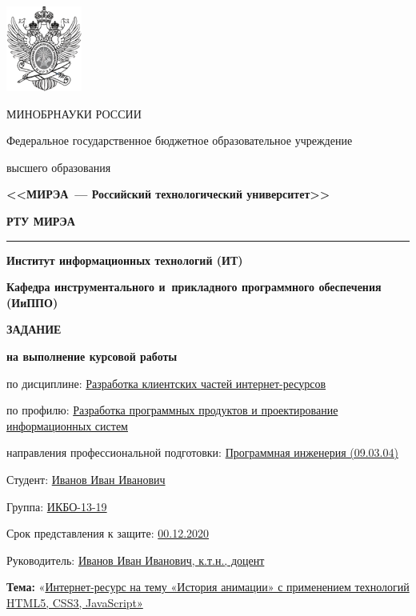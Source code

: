 \documentclass[12pt, a4paper]{extarticle}
\begin{document}
\fontsize{12pt}{1.08}\selectfont

\begin{center}
\includegraphics[width=0.97917in,height=1.10417in]{Images/mirea.png}

\setlength{\parskip}{6pt}
МИНОБРНАУКИ РОССИИ 

Федеральное государственное бюджетное образовательное учреждение
\setlength{\parskip}{0pt}

высшего образования

\textbf{<<МИРЭА~--- Российский технологический университет>>}

\fontsize{16pt}{1.08}\selectfont
\textbf{РТУ МИРЭА}
\fontsize{12pt}{1.08}\selectfont

\setlength{\parskip}{6pt}
\noindent\rule{\textwidth}{2pt}

\textbf{Институт информационных технологий (ИТ)}
\setlength{\parskip}{0pt}

\textbf{Кафедра инструментального и~прикладного программного обеспечения (ИиППО)}

\bigskip
\textbf{ЗАДАНИЕ}

\textbf{на выполнение курсовой работы}

\end{center}

\justifying

\setlength{\parindent}{0in}
по дисциплине: \uline{Разработка клиентских частей
интернет-ресурсов}

по профилю: \uline{Разработка программных продуктов и проектирование
информационных систем}

направления профессиональной подготовки: \uline{Программная
инженерия (09.03.04)}

\medskip

Студент: \uline{Иванов Иван Иванович}

Группа: \uline{ИКБО-13-19}

Срок представления к защите: \uline{00.12.2020}

Руководитель: \uline{Иванов Иван Иванович, к.т.н., доцент}

\bigskip

\textbf{Тема:} «\uline{Интернет-ресурс на тему «История анимации» с
применением технологий HTML5, CSS3, JavaScript»}
\end{document}
